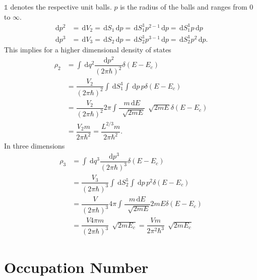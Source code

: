 \documentclass[a4paper,10pt]{article}
\newcommand{\td}{\,\text{d}}
\newcommand{\id}{\mathds{1}}
\numberwithin{equation}{section}
\begin{document}
\begin{multicols}{2}
$\id$ denotes the respective unit balls.
$p$ is the radius of the balls and ranges from $0$ to $\infty$.
\begin{align} 
  \td p^2 &= \td V_2 = \td S_1\td p = \td S_1^\id p^{2-1}\td p = \td S_1^\id p\td p\\
  \td p^3 &= \td V_3 = \td S_2\td p = \td S_2^\id p^{3-1}\td p = \td S_2^\id p^2\td p
.\end{align} 
This implies for a higher dimensional density of states
\begin{align} 
  \rho _2 &= \int_{}^{}\td q^2\dfrac{\td p^2}{(2\pi \hbar )^2}\delta (E-E_c)\\
          &= \dfrac{V_2}{(2\pi \hbar )^2}\int_{}^{}\td S_1^\id\int_{}^{}\td p \,p\delta (E-E_c)\\
          &= \dfrac{V_2}{(2\pi \hbar )^2}2\pi \int_{}^{}\dfrac{m\td E}{\,\sqrt[]{2mE}}\,\sqrt[]{2mE}\delta (E-E_c)\\
          &= \dfrac{V_2m}{2\pi \hbar ^2} = \dfrac{L^{2/3}m}{2\pi \hbar ^2}
.\end{align} 
In three dimensions
\begin{align} 
  \rho _3 &= \int_{}^{}\td q^3\dfrac{\td p^3}{(2\pi \hbar )^3}\delta (E-E_c)\\
          &= \dfrac{V_3}{(2\pi \hbar )^3}\int_{}^{}\td S_2^\id \int_{}^{}\td p\, p^2\delta (E-E_c)\\
          &= \dfrac{V}{(2\pi \hbar )^3}4\pi \int_{}^{}\dfrac{m\td E}{\,\sqrt[]{2mE}}2mE\delta (E-E_c)\\
          &= \dfrac{V4\pi m}{(2\pi \hbar )^3}\,\sqrt[]{2mE_c}=\dfrac{Vm}{2\pi ^2\hbar ^3}\,\sqrt[]{2mE_c}
\end{align} 


\section{Occupation Number}

\end{multicols}
\end{document}
